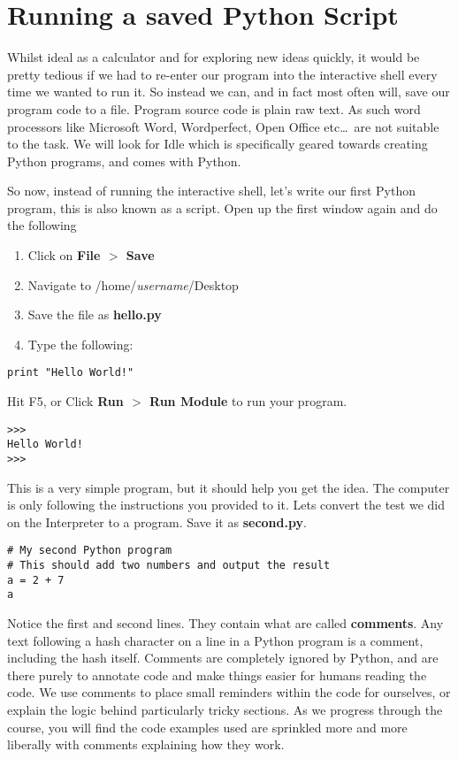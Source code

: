 \section{Running a saved Python Script}

Whilst ideal as a calculator and for exploring new ideas quickly, it   would be pretty tedious if we had to re-enter our program into the   interactive shell every time we wanted to run it. So instead we can,   and in fact most often will, save our program code to a file. Program   source code is plain raw text. As such word processors like Microsoft   Word, Wordperfect, Open Office etc\ldots\ are not suitable to the task. We will   look for Idle which is specifically geared towards creating Python programs,   and comes with   Python. 

So now, instead of running the interactive shell, let's write our   first Python program, this is also known as a script. Open up the first window again and do the following
\begin{enumerate}
    \item Click on \textbf{File $>$ Save}
    \item Navigate to /home/\textit{username}/Desktop
    \item Save the file as \textbf{hello.py}
    \item Type the following:
\end{enumerate}
\begin{lstlisting}
print "Hello World!"
\end{lstlisting}

Hit F5, or Click \textbf{Run $>$ Run Module} to    run your program.


\begin{lstlisting}
>>>
Hello World!
>>>
\end{lstlisting}

This is a very simple program, but it should help you get the    idea. The computer is only following the instructions you provided   to it. Lets convert the test we did on the Interpreter to a program.   Save it as \textbf{second.py}.   
\begin{lstlisting}
# My second Python program
# This should add two numbers and output the result
a = 2 + 7
a
\end{lstlisting}

Notice the first and second lines. They contain what are called   \textbf{comments}. Any text following a hash character on a   line in a Python program is a comment, including the hash itself.   Comments are completely ignored by Python, and are there purely to   annotate code and make things easier for humans reading the code. We   use comments to place small reminders within the code for ourselves, or   explain the logic behind particularly tricky sections. As we   progress through the course, you will find the code examples used are   sprinkled more and more liberally with comments explaining how they   work.

